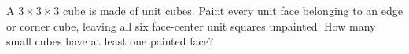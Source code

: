 A $3\times3\times3$ cube is made of unit cubes. Paint every unit face belonging to an edge or corner cube, leaving all six face-center unit squares unpainted. How many small cubes have at least one painted face?
